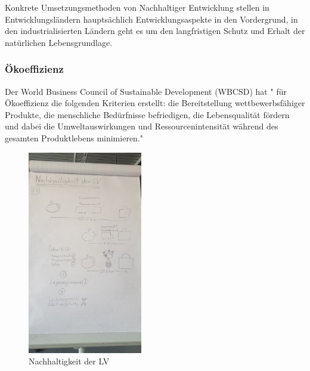 \documentclass{article}
\begin{document}
 Konkrete Umsetzungsmethoden von Nachhaltiger Entwicklung stellen in Entwicklungsländern hauptsächlich Entwicklungsaspekte in den Vordergrund, in den industrialisierten Ländern geht es um den langfristigen Schutz und Erhalt der natürlichen Lebensgrundlage. 
\subsubsection{Ökoeffizienz}
 Der World Business Council of Sustainable Development (WBCSD) hat " für Ökoeffizienz die folgenden Kriterien erstellt: die Bereitstellung wettbewerbsfähiger Produkte, die menschliche Bedürfnisse befriedigen, die Lebensqualität fördern und dabei die Umweltauswirkungen und Ressourcenintensität während des gesamten Produktlebens minimieren." \cite{OkoeffizienzBrockhaus.de}

\begin{figure}[htp]
\centering
\includegraphics[width=5cm]{image_folder/skizze1.jpg}
\caption{Nachhaltigkeit der LV}
\label{fig:Skizze_Nachhaltigkeit}
\end{figure}

\newpage
\listoffigures
\printbibliography
\end{document}
